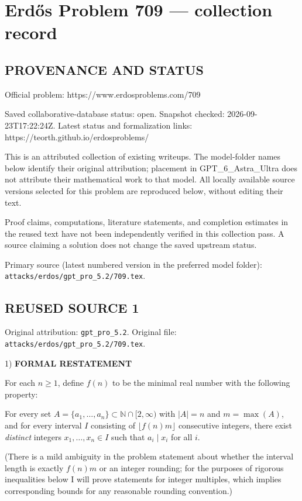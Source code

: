 \section*{Erd\H{o}s Problem 709 --- collection record}

\subsection*{PROVENANCE AND STATUS}
Official problem: https://www.erdosproblems.com/709

Saved collaborative-database status: open.
Snapshot checked: 2026-09-23T17:22:24Z.
Latest status and formalization links: https://teorth.github.io/erdosproblems/

This is an attributed collection of existing writeups. The model-folder names below identify their original attribution; placement in GPT\_6\_Astra\_Ultra does not attribute their mathematical work to that model. All locally available source versions selected for this problem are reproduced below, without editing their text.

Proof claims, computations, literature statements, and completion estimates in the reused text have not been independently verified in this collection pass. A source claiming a solution does not change the saved upstream status.

Primary source (latest numbered version in the preferred model folder): \texttt{attacks/erdos/gpt\_pro\_5.2/709.tex}.

\subsection*{REUSED SOURCE 1}
Original attribution: \texttt{gpt\_pro\_5.2}.
Original file: \texttt{attacks/erdos/gpt\_pro\_5.2/709.tex}.


1) \textbf{FORMAL RESTATEMENT}

For each $n\ge 1$, define $f(n)$ to be the minimal real number with the following property:

For every set $A=\{a_1,\dots,a_n\}\subset\mathbb{N}\cap[2,\infty)$ with $|A|=n$ and $m=\max(A)$, and for every interval $I$ consisting of $\lfloor f(n)m\rfloor$ consecutive integers, there exist \emph{distinct} integers $x_1,\dots,x_n\in I$ such that $a_i\mid x_i$ for all $i$.

(There is a mild ambiguity in the problem statement about whether the interval length is exactly $f(n)m$ or an integer rounding; for the purposes of rigorous inequalities below I will prove statements for integer multiples, which implies corresponding bounds for any reasonable rounding convention.)

